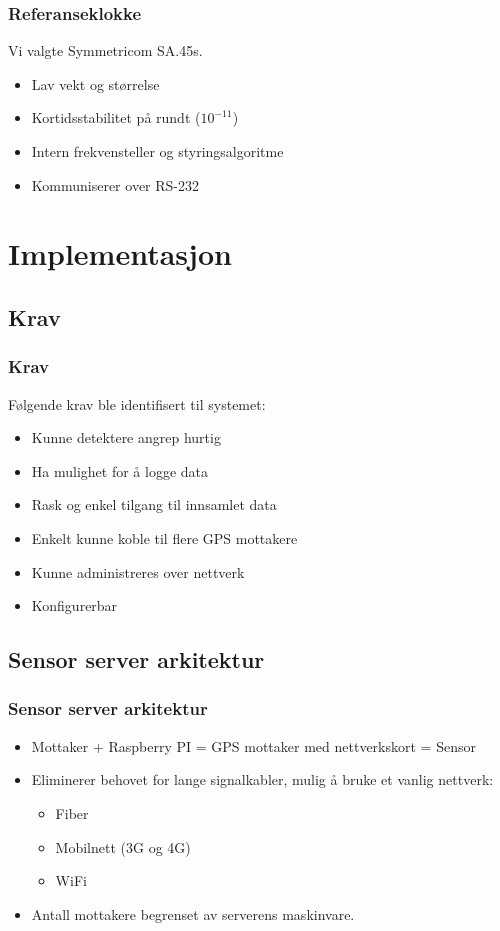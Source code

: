 \documentclass[xcolor=table]{beamer}
\begin{document}
\begin{frame}
  \frametitle{Referanseklokke}
  Vi valgte Symmetricom SA.45s. 
  \begin{itemize}
    \item Lav vekt og størrelse
    \item Kortidsstabilitet på rundt ($10^{-11}$)
    \item Intern frekvensteller og styringsalgoritme
    \item Kommuniserer over RS-232
  \end{itemize}
\end{frame}

\section{Implementasjon}
\subsection{Krav}
\begin{frame}
  \frametitle{Krav}
  Følgende krav ble identifisert til systemet:
  \begin{itemize}
    \item Kunne detektere angrep hurtig
    \item Ha mulighet for å logge data
    \item Rask og enkel tilgang til innsamlet data
    \item Enkelt kunne koble til flere GPS mottakere
    \item Kunne administreres over nettverk
    \item Konfigurerbar 
  \end{itemize}
\end{frame}

\subsection{Sensor server arkitektur}
\begin{frame}
  \frametitle{Sensor server arkitektur}
  \begin{itemize}
    \item Mottaker + Raspberry PI = GPS mottaker med nettverkskort = Sensor
    \item Eliminerer behovet for lange signalkabler, mulig å bruke et vanlig nettverk:
    \begin{itemize}
      \item Fiber
      \item Mobilnett (3G og 4G)
      \item WiFi
    \end{itemize}
    \item Antall mottakere begrenset av serverens maskinvare.
  \end{itemize}
\end{frame}
\end{document}
